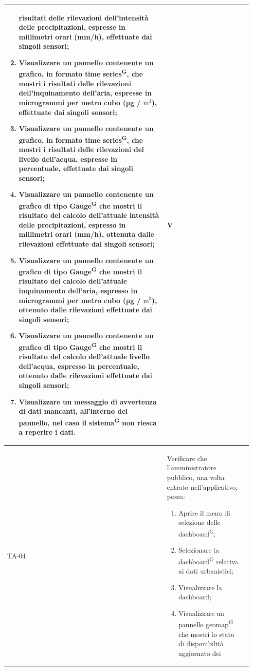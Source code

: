 \documentclass[8pt]{article}
\newcommand{\glossterm}[1]{#1\textsuperscript{G}} %
\begin{document}
\begin{longtable}{|>{\centering}p{2cm}|>{\RaggedRight}m{12cm}|>{\centering\arraybackslash}p{2cm}|}
\begin{enumerate}[start=8]
            risultati delle rilevazioni dell’intensità delle precipitazioni, espresse in millimetri orari (mm/h), effettuate dai
            singoli sensori;
        \item Visualizzare un pannello contenente un grafico, in formato \glossterm{time series}, che mostri i
            risultati delle rilevazioni dell’inquinamento dell'aria, espresse in microgrammi per metro cubo (µg / $\mbox{m}^{\mbox{3}}$), effettuate dai
            singoli sensori;
        \item Visualizzare un pannello contenente un grafico, in formato \glossterm{time series}, che mostri i
            risultati delle rilevazioni del livello dell'acqua, espresse in percentuale, effettuate dai
            singoli sensori;
        \item Visualizzare un pannello contenente un grafico di tipo \glossterm{Gauge} che mostri il risultato
            del calcolo dell'attuale intensità delle precipitazioni, espresso in millimetri orari (mm/h), ottenuta dalle rilevazioni effettuate dai singoli sensori;
        \item Visualizzare un pannello contenente un grafico di tipo \glossterm{Gauge} che mostri il risultato
            del calcolo dell'attuale inquinamento dell'aria, espresso in microgrammi per metro cubo (µg / $\mbox{m}^{\mbox{3}}$), ottenuto dalle rilevazioni effettuate dai singoli sensori;
        \item Visualizzare un pannello contenente un grafico di tipo \glossterm{Gauge} che mostri il risultato
            del calcolo dell'attuale livello dell'acqua, espresso in percentuale, ottenuto dalle rilevazioni effettuate dai singoli sensori;
        \item Visualizzare un messaggio di avvertenza di dati mancanti, all’interno del pannello, nel caso il \glossterm{sistema} non riesca a reperire i dati.
    \end{enumerate}
    & V \\
    \hline
    TA-04 & Verificare che l'amministratore pubblico, una volta entrato nell'applicativo, possa:
    \begin{enumerate}
        \setlength\itemsep{0em}
        \item Aprire il menu di selezione delle \glossterm{dashboard};
        \item Selezionare la \glossterm{dashboard} relativa ai dati urbanistici;
        \item Visualizzare la dashboard;
        \item Visualizzare un pannello \glossterm{geomap} che mostri lo stato di disponibilità aggiornato dei

\end{enumerate}
\end{longtable}
\end{document}
